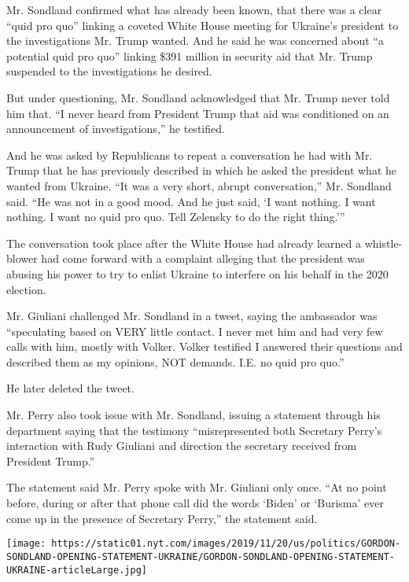 Mr. Sondland confirmed what has already been known, that there was a
clear ``quid pro quo'' linking a coveted White House meeting for
Ukraine's president to the investigations Mr. Trump wanted. And he said
he was concerned about ``a potential quid pro quo'' linking \$391
million in security aid that Mr. Trump suspended to the investigations
he desired.

But under questioning, Mr. Sondland acknowledged that Mr. Trump never
told him that. ``I never heard from President Trump that aid was
conditioned on an announcement of investigations,'' he testified.

And he was asked by Republicans to repeat a conversation he had with Mr.
Trump that he has previously described in which he asked the president
what he wanted from Ukraine. ``It was a very short, abrupt
conversation,'' Mr. Sondland said. ``He was not in a good mood. And he
just said, `I want nothing. I want nothing. I want no quid pro quo. Tell
Zelensky to do the right thing.'''

The conversation took place after the White House had already learned a
whistle-blower had come forward with a complaint alleging that the
president was abusing his power to try to enlist Ukraine to interfere on
his behalf in the 2020 election.

Mr. Giuliani challenged Mr. Sondland in a tweet, saying the ambassador
was ``speculating based on VERY little contact. I never met him and had
very few calls with him, mostly with Volker. Volker testified I answered
their questions and described them as my opinions, NOT demands. I.E. no
quid pro quo.''

He later deleted the tweet.

Mr. Perry also took issue with Mr. Sondland, issuing a statement through
his department saying that the testimony ``misrepresented both Secretary
Perry's interaction with Rudy Giuliani and direction the secretary
received from President Trump.''

The statement said Mr. Perry spoke with Mr. Giuliani only once. ``At no
point before, during or after that phone call did the words `Biden' or
`Burisma' ever come up in the presence of Secretary Perry,'' the
statement said.

\href{https://www.nytimes.com/interactive/2019/11/20/us/politics/gordon-sondland-opening-statement-ukraine.html}{}

\texttt{[image: https://static01.nyt.com/images/2019/11/20/us/politics/GORDON-SONDLAND-OPENING-STATEMENT-UKRAINE/GORDON-SONDLAND-OPENING-STATEMENT-UKRAINE-articleLarge.jpg]}

